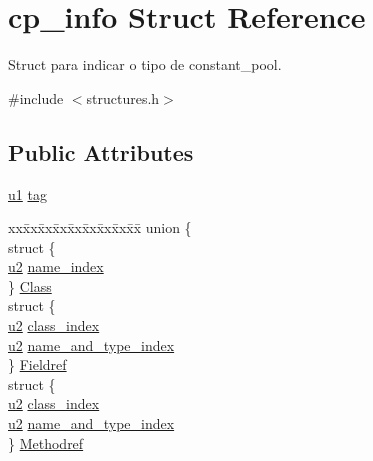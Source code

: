 \hypertarget{structcp__info}{}\section{cp\+\_\+info Struct Reference}
\label{structcp__info}


Struct para indicar o tipo de constant\+\_\+pool.  




{\ttfamily \#include $<$structures.\+h$>$}

\subsection*{Public Attributes}
\begin{DoxyCompactItemize}
\item 
\hyperlink{structures_8h_a64f8055b64cf2a4c299c841130c5c938}{u1} \hyperlink{structcp__info_a045b8801a6e96a2a31d3b62ea684f141}{tag}
\item 
\begin{tabbing}
xx\=xx\=xx\=xx\=xx\=xx\=xx\=xx\=xx\=\kill
union \{\\
\>struct \{\\
\>\>\hyperlink{structures_8h_a55ef8d87fd202b8417704c089899c5b9}{u2} \hyperlink{structcp__info_a0b2c4677d0d56defd858fdc796caec87}{name\_index}\\
\>\} \hyperlink{structcp__info_a322117cc9b35710232212d96443b9c46}{Class}\\
\>struct \{\\
\>\>\hyperlink{structures_8h_a55ef8d87fd202b8417704c089899c5b9}{u2} \hyperlink{structcp__info_a1c7c3f3e2f9a620669b5f5cc51249ef8}{class\_index}\\
\>\>\hyperlink{structures_8h_a55ef8d87fd202b8417704c089899c5b9}{u2} \hyperlink{structcp__info_a1b947f3ff3eee58acf5500debf45848c}{name\_and\_type\_index}\\
\>\} \hyperlink{structcp__info_aee4742a1bbb698a449a95a88dfc6b4f9}{Fieldref}\\
\>struct \{\\
\>\>\hyperlink{structures_8h_a55ef8d87fd202b8417704c089899c5b9}{u2} \hyperlink{structcp__info_a1c7c3f3e2f9a620669b5f5cc51249ef8}{class\_index}\\
\>\>\hyperlink{structures_8h_a55ef8d87fd202b8417704c089899c5b9}{u2} \hyperlink{structcp__info_a1b947f3ff3eee58acf5500debf45848c}{name\_and\_type\_index}\\
\>\} \hyperlink{structcp__info_ae02638b6c90e9d24eae9c8bfc4b09f1c}{Methodref}\\

\end{tabbing}
\end{DoxyCompactItemize}
